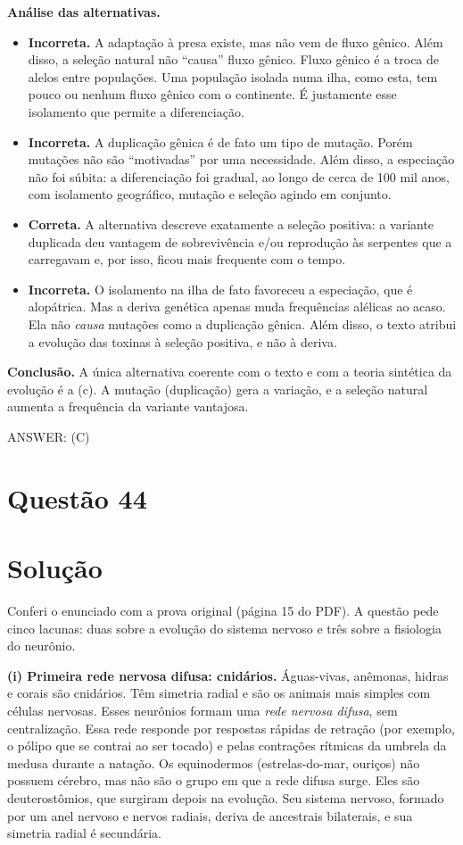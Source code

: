\documentclass{article}%
\begin{document}
\textbf{Análise das alternativas.}
\begin{itemize}
  \item[(a)] \textbf{Incorreta.} A adaptação à presa existe, mas não vem de fluxo gênico. Além disso, a seleção natural não ``causa'' fluxo gênico. Fluxo gênico é a troca de alelos entre populações. Uma população isolada numa ilha, como esta, tem pouco ou nenhum fluxo gênico com o continente. É justamente esse isolamento que permite a diferenciação.
  \item[(b)] \textbf{Incorreta.} A duplicação gênica é de fato um tipo de mutação. Porém mutações não são ``motivadas'' por uma necessidade. Além disso, a especiação não foi súbita: a diferenciação foi gradual, ao longo de cerca de 100 mil anos, com isolamento geográfico, mutação e seleção agindo em conjunto.
  \item[(c)] \textbf{Correta.} A alternativa descreve exatamente a seleção positiva: a variante duplicada deu vantagem de sobrevivência e/ou reprodução às serpentes que a carregavam e, por isso, ficou mais frequente com o tempo.
  \item[(d)] \textbf{Incorreta.} O isolamento na ilha de fato favoreceu a especiação, que é alopátrica. Mas a deriva genética apenas muda frequências alélicas ao acaso. Ela não \emph{causa} mutações como a duplicação gênica. Além disso, o texto atribui a evolução das toxinas à seleção positiva, e não à deriva.
\end{itemize}

\textbf{Conclusão.} A única alternativa coerente com o texto e com a teoria sintética da evolução é a (c). A mutação (duplicação) gera a variação, e a seleção natural aumenta a frequência da variante vantajosa.

ANSWER: (C)%
\newpage%
\section*{Questão 44}

\section*{Solução}

Conferi o enunciado com a prova original (página 15 do PDF). A questão pede cinco lacunas: duas sobre a evolução do sistema nervoso e três sobre a fisiologia do neurônio.

\textbf{(i) Primeira rede nervosa difusa: cnidários.} Águas-vivas, anêmonas, hidras e corais são cnidários. Têm simetria radial e são os animais mais simples com células nervosas. Esses neurônios formam uma \emph{rede nervosa difusa}, sem centralização. Essa rede responde por respostas rápidas de retração (por exemplo, o pólipo que se contrai ao ser tocado) e pelas contrações rítmicas da umbrela da medusa durante a natação. Os equinodermos (estrelas-do-mar, ouriços) não possuem cérebro, mas não são o grupo em que a rede difusa surge. Eles são deuterostômios, que surgiram depois na evolução. Seu sistema nervoso, formado por um anel nervoso e nervos radiais, deriva de ancestrais bilaterais, e sua simetria radial é secundária.
\end{document}
